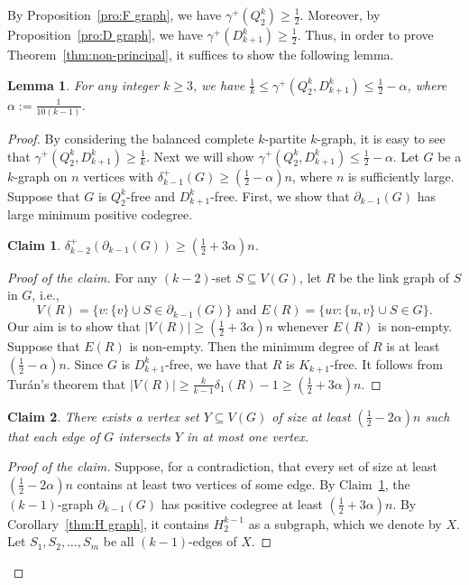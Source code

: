 \documentclass[11pt]{article}
\newtheorem{lemma}[theorem]{Lemma}
\newtheorem{cla}{Claim}[theorem]
\newenvironment{poc}{\begin{proof}[Proof of the claim]\renewcommand*{\qedsymbol}{$\blacksquare$}}{\end{proof}}
\begin{document}
By Proposition~\ref{pro:F graph}, we have $\gamma^+(Q_2^k)\ge \frac{1}{2}$.
Moreover, by Proposition~\ref{pro:D graph}, we have $\gamma^+(D_{k+1}^k)\ge \frac{1}{2}$.
Thus, in order to prove Theorem~\ref{thm:non-principal}, it suffices to show the following lemma.
\begin{lemma}\label{lem:main}
    For any integer $k\ge 3$, we have $\frac{1}{k}\le\gamma^+(Q_2^k,D_{k+1}^k) \le \frac{1}{2}-\alpha$, where $\alpha := \frac{1}{10(k-1)}$. 
\end{lemma}
\begin{proof}
    By considering the balanced complete $k$-partite $k$-graph, it is easy to see that $ \gamma^+(Q_2^k,D_{k+1}^k) \ge \frac{1}{k}$.
    Next we will show $\gamma^+(Q_2^k,D_{k+1}^k) \le \frac{1}{2}-\alpha$.
    Let $G$ be a $k$-graph on $n$ vertices with $\delta_{k-1}^+(G)\ge\left(\frac{1}{2}-\alpha \right)n$, where $n$ is sufficiently large.
    Suppose that $G$ is $Q_2^k$-free and $D_{k+1}^k$-free.
    First, we show that $\partial_{k-1}(G)$ has large minimum positive codegree.
    
    
    \begin{cla}\label{cl:k-2degree}
    $\delta_{k-2}^+(\partial_{k-1}(G))\ge\left(\frac{1}{2}+3\alpha\right)n$.
    \end{cla}
    \begin{poc}
    For any $(k-2)$-set $S\subseteq V(G)$, let $R$ be the link graph of $S$ in $G$, i.e., 
    \[
    \mbox{$V(R)=\{v:\{v\}\cup S\in\partial_{k-1}(G)\}$ \ \ and \ \ $E(R)=\{uv:\{u,v\}\cup S\in G\}$.}
    \] Our aim is to show that $|V(R)|\ge\left(\frac{1}{2}+3\alpha\right)n$ whenever $E(R)$ is non-empty. Suppose that $E(R)$ is non-empty. Then the minimum degree of $R$ is at least $\left(\frac{1}{2}-\alpha\right)n$. Since $G$ is $D_{k+1}^k$-free, we have that $R$ is $K_{k+1}$-free. It follows from Tur\'an's theorem that $|V(R)|\ge \frac{k}{k-1}\delta_1(R)-1\ge \left(\frac{1}{2}+3\alpha\right)n$.
    \end{poc}
    
    \begin{cla}\label{cl:IndepY}
    There exists a vertex set $Y\subseteq V(G)$ of size at least $\left(\frac{1}{2}-2\alpha\right)n$ such that each edge of $G$ intersects $Y$ in at most one vertex.
    \end{cla}
    \begin{poc}
    Suppose, for a contradiction, that every set of size at least $\left(\frac{1}{2}-2\alpha\right)n$ contains at least two vertices of some edge.  By Claim~\ref{cl:k-2degree}, the $(k-1)$-graph $\partial_{k-1}(G)$ has positive codegree at least $\left(\frac{1}{2}+3\alpha\right)n$. By Corollary~\ref{thm:H graph}, it contains $H_2^{k-1}$ as a subgraph, which we denote by $X$. Let $S_1,S_2,\dots, S_m$ be all $(k-1)$-edges of $X$.
    

\end{poc}
\end{proof}
\end{document}
